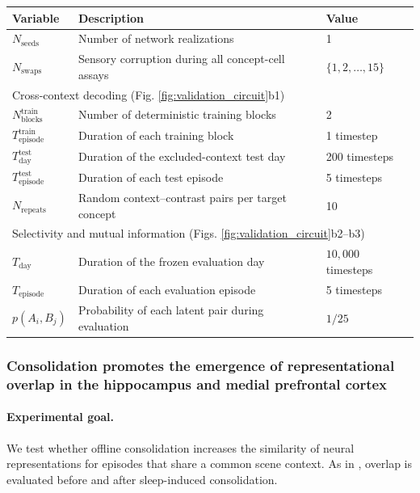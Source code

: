 \documentclass{article}
\providecommand{\DIFaddbeginFL}{} %
\providecommand{\DIFaddendFL}{} %
\providecommand{\DIFdelendFL}{} %
\begin{document}
\begin{table}[h!]
\DIFdelendFL \DIFaddbeginFL \label{tab:figure_5_concept_cells}
\begin{tabular}{lll}
\toprule
\textbf{Variable} & \textbf{Description} & \textbf{Value} \\
\midrule
$N_{\textrm{seeds}}$ & Number of network realizations & 1 \\
$N_{\textrm{swaps}}$ & Sensory corruption during all concept-cell assays & $\{1,2,\ldots,15\}$ \\
\midrule
\multicolumn{3}{l}{Cross-context decoding (Fig. \ref{fig:validation_circuit}b1)} \\
 $N_{\textrm{blocks}}^{\textrm{train}}$ & Number of deterministic training blocks & 2 \\
$T_{\textrm{episode}}^{\textrm{train}}$ & Duration of each training block & 1 timestep \\
$T_{\textrm{day}}^{\textrm{test}}$ & Duration of the excluded-context test day & 200 timesteps \\
$T_{\textrm{episode}}^{\textrm{test}}$ & Duration of each test episode & 5 timesteps \\
$N_{\textrm{repeats}}$ & Random context--contrast pairs per target concept & 10 \\
\midrule
\multicolumn{3}{l}{Selectivity and mutual information (Figs. \ref{fig:validation_circuit}b2--b3)} \\
$T_{\textrm{day}}$ & Duration of the frozen evaluation day & $10{,}000$ timesteps \\
$T_{\textrm{episode}}$ & Duration of each evaluation episode & 5 timesteps \\
$p(A_i,B_j)$ & Probability of each latent pair during evaluation & $1/25$ \\
\bottomrule
\end{tabular}
\DIFaddendFL \end{table}
\subsubsection*{Consolidation promotes the emergence of representational overlap in the hippocampus and medial prefrontal cortex }

\paragraph{Experimental goal.}
We test whether offline consolidation increases the similarity of neural representations for episodes that share a common scene context. As in , overlap is evaluated before and after sleep-induced consolidation.
\end{document}
